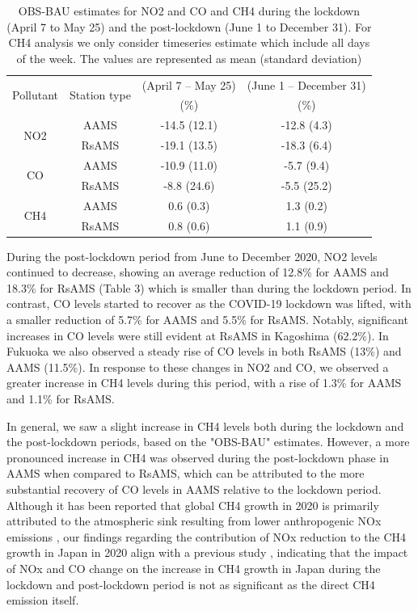 \begin{table}[tbh!]
    \centering
    \caption[short]{OBS-BAU estimates for NO2 and CO and CH4 during the lockdown (April 7 to May 25) and the post-lockdown (June 1 to December 31). For CH4 analysis we only consider timeseries estimate which include all days of the week. The values are represented as mean (standard deviation)}
    \begin{tabular}{c c c c}
    \hline
    \multirow{2}{*}{Pollutant} & \multirow{2}{*}{Station type} & (April 7 – May 25) & (June 1 – December 31) \\ 
                                &                              & (\%) & (\%) \\ \hline
    \multirow{2}{*}{NO2} & AAMS & -14.5 (12.1) & -12.8 (4.3)  \\
        & RsAMS & -19.1 (13.5) & -18.3 (6.4)  \\ \hline
    \multirow{2}{*}{CO} & AAMS & -10.9 (11.0) & -5.7 (9.4)  \\
        & RsAMS & -8.8 (24.6) & -5.5 (25.2)  \\ \hline
    \multirow{2}{*}{CH4} & AAMS & 0.6 (0.3) & 1.3 (0.2)  \\
        & RsAMS & 0.8 (0.6) & 1.1 (0.9)  \\ \hline
    \end{tabular}
    \label{tab:chap4_tab3}
\end{table}

During the post-lockdown period from June to December 2020, NO2 levels continued to decrease, showing an average reduction of 12.8\% for AAMS and 18.3\% for RsAMS (Table 3) which is smaller than during the lockdown period. In contrast, CO levels started to recover as the COVID-19 lockdown was lifted, with a smaller reduction of 5.7\% for AAMS and 5.5\% for RsAMS. Notably, significant increases in CO levels were still evident at RsAMS in Kagoshima (62.2\%). In Fukuoka we also observed a steady rise of CO levels in both RsAMS (13\%) and AAMS (11.5\%). In response to these changes in NO2 and CO, we observed a greater increase in CH4 levels during this period, with a rise of 1.3\% for AAMS and 1.1\% for RsAMS.\par
In general, we saw a slight increase in CH4 levels both during the lockdown and the post-lockdown periods, based on the "OBS-BAU" estimates. However, a more pronounced increase in CH4 was observed during the post-lockdown phase in AAMS when compared to RsAMS, which can be attributed to the more substantial recovery of CO levels in AAMS relative to the lockdown period. Although it has been reported that global CH4 growth in 2020 is primarily attributed to the atmospheric sink resulting from lower anthropogenic NOx emissions \citep{stevenson2022covid,peng2022wetland}, our findings regarding the contribution of NOx reduction to the CH4 growth in Japan in 2020 align with a previous study \citep{akimoto2022rethinking,qu2022attribution,feng2023methane}, indicating that the impact of NOx and CO change on the increase in CH4 growth in Japan during the lockdown and post-lockdown period is not as significant as the direct CH4 emission itself. \par


